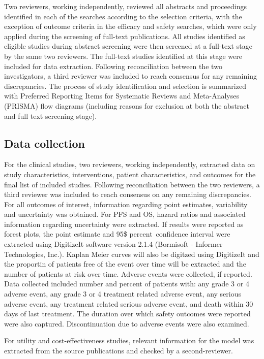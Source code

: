 \documentclass[11pt,final,fleqn]{article}\usepackage[]{graphicx}\usepackage[]{color}
\theoremstyle{plain}
\begin{document}
{\begin{appendices}
Two reviewers, working independently, reviewed all abstracts and proceedings identified in each of the searches according to the selection criteria, with the exception of outcome criteria in the efficacy and safety searches, which were only applied during the screening of full-text publications. All studies identified as eligible studies during abstract screening were then screened at a full-text stage by the same two reviewers. The full-text studies identified at this stage were included for data extraction. Following reconciliation between the two investigators, a third reviewer was included to reach consensus for any remaining discrepancies. The process of study identification and selection is summarized with Preferred Reporting Items for Systematic Reviews and Meta-Analyses (PRISMA) flow diagrams (including reasons for exclusion at both the abstract and full text screening stage). 

\subsection{Data collection}

For the clinical studies, two reviewers, working independently, extracted data on study characteristics, interventions, patient characteristics, and outcomes for the final list of included studies. Following reconciliation between the two reviewers, a third reviewer was included to reach consensus on any remaining discrepancies. For all outcomes of interest, information regarding point estimates, variability and uncertainty was obtained. For PFS and OS, hazard ratios and associated information regarding uncertainty were extracted. If results were reported as forest plots, the point estimate and 95\$ percent\ confidence interval were extracted using DigitizeIt software version 2.1.4 (Bormisoft - Informer Technologies, Inc.). Kaplan Meier curves will also be digitzed using DigitizeIt and the proportin of patients free of the event over time will be extracted and the number of patients at risk over time. Adverse events were collected, if reported. Data collected included number and percent of patients with: any grade 3 or 4 adverse event, any grade 3 or 4 treatment related adverse event, any serious adverse event, any treatment related serious adverse event, and death within 30 days of last treatment. The duration over which safety outcomes were reported were also captured. Discontinuation due to adverse events were also examined. 

For utility and cost-effectiveness studies, relevant information for the model was extracted from the source publications and checked by a second-reviewer. 


\end{appendices}}
\end{document}
